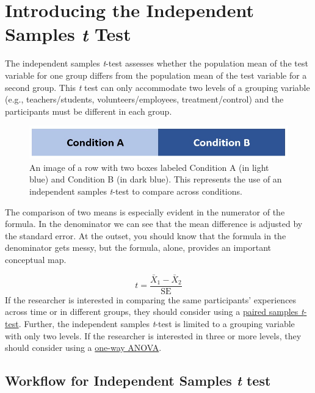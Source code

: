\documentclass[
  11pt,
]{book}
\begin{document}
\hypertarget{introducing-the-independent-samples-t-test}{%
\section{\texorpdfstring{Introducing the Independent Samples \emph{t} Test}{Introducing the Independent Samples t Test}}\label{introducing-the-independent-samples-t-test}}

The independent samples \emph{t}-test assesses whether the population mean of the test variable for one group differs from the population mean of the test variable for a second group. This \emph{t} test can only accommodate two levels of a grouping variable (e.g., teachers/students, volunteers/employees, treatment/control) and the participants must be different in each group.

\begin{figure}
\centering
\includegraphics{images/ttests/conditions_paired.jpg}
\caption{An image of a row with two boxes labeled Condition A (in light blue) and Condition B (in dark blue). This represents the use of an independent samples \emph{t}-test to compare across conditions.}
\end{figure}

The comparison of two means is especially evident in the numerator of the formula. In the denominator we can see that the mean difference is adjusted by the standard error. At the outset, you should know that the formula in the denominator gets messy, but the formula, alone, provides an important conceptual map.

\[t = \frac{\bar{X}_1 - \bar{X}_2}{\mbox{SE}}\]
If the researcher is interested in comparing the same participants' experiences across time or in different groups, they should consider using a \protect\hyperlink{tPaired}{paired samples \emph{t}-test}. Further, the independent samples \emph{t}-test is limited to a grouping variable with only two levels. If the researcher is interested in three or more levels, they should consider using a \protect\hyperlink{oneway}{one-way ANOVA}.

\hypertarget{workflow-for-independent-samples-t-test}{%
\subsection{\texorpdfstring{Workflow for Independent Samples \emph{t} test}{Workflow for Independent Samples t test}}\label{workflow-for-independent-samples-t-test}}
\end{document}
